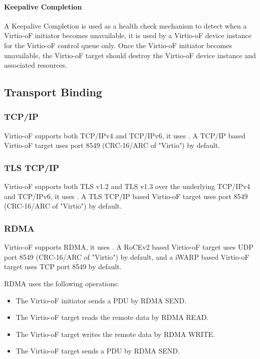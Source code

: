 \paragraph{Keepalive Completion}\label{sec:Virtio Transport Options / Virtio Over Fabrics / Commands Definition / Opcodes / Keepalive Completion}
A Keepalive Completion is used as a health check mechanism to detect when a Virtio-oF initiator becomes unavailable, it is used by a Virtio-oF device instance for the Virtio-oF control queue only.
Once the Virtio-oF initiator becomes unavailable, the Virtio-oF target should destroy the Virtio-oF device instance and associated resources.


\subsection{Transport Binding}\label{sec:Virtio Transport Options / Virtio Over Fabrics / Transport Binding}

\subsubsection{TCP/IP}\label{sec:Virtio Transport Options / Virtio Over Fabrics / Transport Binding / TCP IP}
Virtio-oF supports both TCP/IPv4 and TCP/IPv6, it uses
.
A TCP/IP based Virtio-oF target uses port 8549 (CRC-16/ARC of "Virtio") by default.

\subsubsection{TLS TCP/IP}\label{sec:Virtio Transport Options / Virtio Over Fabrics / Transport Binding / TLS TCP IP}
Virtio-oF supports both TLS v1.2 and TLS v1.3 over the underlying TCP/IPv4 and TCP/IPv6, it uses
.
A TLS TCP/IP based Virtio-oF target uses port 8549 (CRC-16/ARC of "Virtio") by default.

\subsubsection{RDMA}\label{sec:Virtio Transport Options / Virtio Over Fabrics / Transport Binding / RDMA}
Virtio-oF supports RDMA, it uses
.
A RoCEv2 based Virtio-oF target uses UDP port 8549 (CRC-16/ARC of "Virtio") by default, and a iWARP based Virtio-oF target uses TCP port 8549 by default.

RDMA uses the following operations:
\begin{itemize}
\item The Virtio-oF initiator sends a PDU by RDMA SEND.
\item The Virtio-oF target reads the remote data by RDMA READ.
\item The Virtio-oF target writes the remote data by RDMA WRITE.
\item The Virtio-oF target sends a PDU by RDMA SEND.
\end{itemize}
